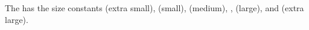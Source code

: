 \begin{module}[id=five-sizes]
  \begin{definition}
    The  has the size constants  (extra small),
     (small),  (medium), , (large), and  (extra large).
  \end{definition}
\end{module}
